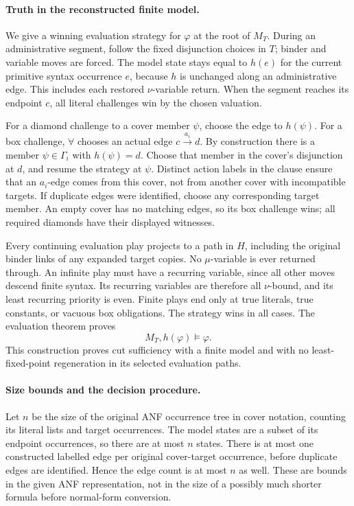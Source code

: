 \paragraph{Truth in the reconstructed finite model.}
We give a winning evaluation
strategy for \(\varphi\) at
the root of \(M_T\).
During an administrative
segment, follow the fixed
disjunction choices in \(T\);
binder and variable moves
are forced. The model state
stays equal to \(h(e)\)
for the current primitive
syntax occurrence \(e\),
because \(h\) is unchanged
along an administrative edge.
This includes each restored
\(\nu\)-variable return.
When the segment reaches
its endpoint \(c\), all
literal challenges win by
the chosen valuation.

For a diamond challenge
to a cover member \(\psi\),
choose the edge to \(h(\psi)\).
For a box challenge,
\(\forall\) chooses an
actual edge
\(c\xrightarrow{a_i}d\).
By construction there is
a member \(\psi\in\Gamma_i\)
with \(h(\psi)=d\).
Choose that member in
the cover's disjunction
at \(d\), and resume
the strategy at \(\psi\).
Distinct action labels in
the clause ensure that
an \(a_i\)-edge comes
from this cover, not
from another cover with
incompatible targets.
If duplicate edges were
identified, choose any
corresponding target member.
An empty cover has no
matching edges, so its
box challenge wins; all
required diamonds have
their displayed witnesses.

Every continuing evaluation
play projects to a path
in \(H\), including the
original binder links of
any expanded target copies.
No \(\mu\)-variable is
ever returned through.
An infinite play must
have a recurring variable,
since all other moves
descend finite syntax.
Its recurring variables
are therefore all
\(\nu\)-bound, and its
least recurring priority
is even.
Finite plays end only
at true literals, true
constants, or vacuous
box obligations.
The strategy wins in
all cases. The evaluation
theorem proves
\[
 M_T,h(\varphi)\models\varphi.
\]
This construction proves
cut sufficiency with a
finite model and with
no least-fixed-point
regeneration in its
selected evaluation paths.

\paragraph{Size bounds and the decision procedure.}
Let \(n\) be the size of
the original ANF occurrence
tree in cover notation,
counting its literal lists
and target occurrences.
The model states are a
subset of its endpoint
occurrences, so there are
at most \(n\) states.
There is at most one
constructed labelled edge
per original cover-target
occurrence, before duplicate
edges are identified.
Hence the edge count
is at most \(n\) as well.
These are bounds in the
given ANF representation,
not in the size of a
possibly much shorter
formula before normal-form
conversion.

